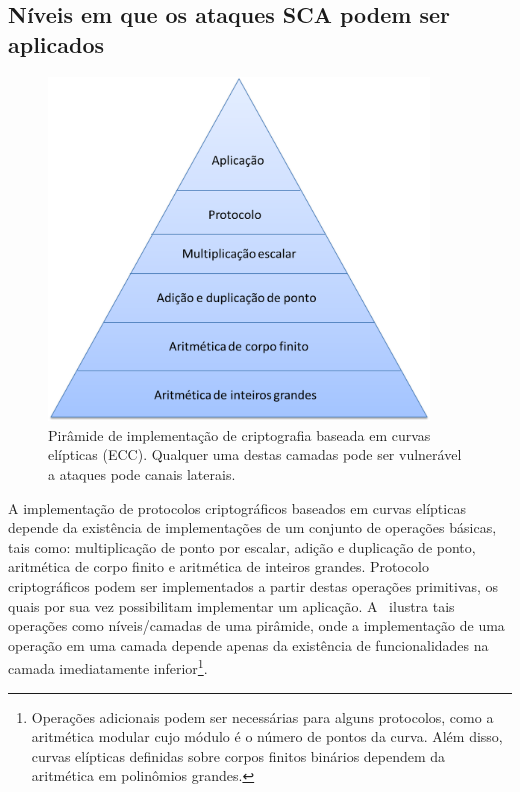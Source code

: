\subsection{Níveis em que os ataques SCA podem ser aplicados}


\begin{figure}[h!tb]
	\centering   %
	\includegraphics[width=0.9\textwidth]{figures/piramide_ECC.png}
	\caption{
		Pirâmide de implementação de criptografia baseada em curvas elípticas (ECC). Qualquer uma destas camadas pode ser vulnerável a ataques pode canais laterais.
	}
	\label{fig:pyramid-ecc}
\end{figure}

A implementação de protocolos criptográficos baseados em curvas elípticas depende da existência de implementações de um conjunto de operações básicas, tais como: multiplicação de ponto por escalar, adição e duplicação de ponto, aritmética de corpo finito e aritmética de inteiros grandes. Protocolo criptográficos podem ser implementados a partir destas operações primitivas, os quais por sua vez possibilitam implementar um aplicação. A~ ilustra tais operações como níveis/camadas de uma pirâmide, onde a implementação de uma operação em uma camada depende apenas da existência de funcionalidades na camada imediatamente inferior\footnote{Operações adicionais podem ser necessárias para alguns protocolos, como a aritmética modular cujo módulo é o número de pontos da curva. Além disso, curvas elípticas definidas sobre corpos finitos binários dependem da aritmética em polinômios grandes.}.

